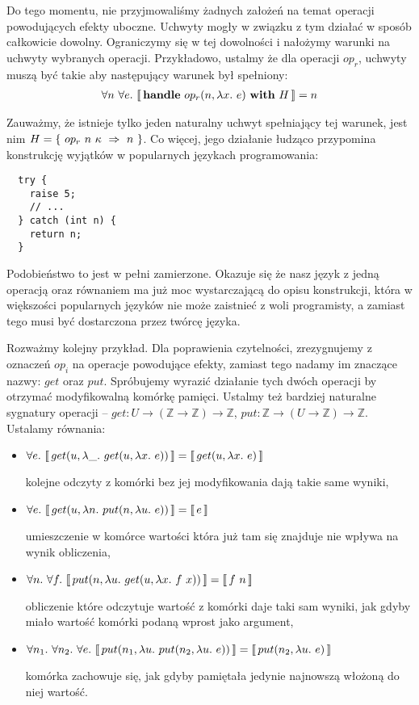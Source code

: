 Do tego momentu, nie przyjmowaliśmy żadnych założeń na temat operacji powodujących efekty uboczne. Uchwyty mogły w związku z tym działać w sposób całkowicie dowolny. Ograniczymy się w tej dowolności i nałożymy warunki na uchwyty wybranych operacji. Przykładowo, ustalmy że dla operacji \(op_r\), uchwyty muszą być takie aby następujący warunek był spełniony:
\begin{align}
  \forall n\ \forall e.\ \llbracket\, \mathbf{handle}\ op_r(n, \lambda x.\ e)\ \mathbf{with}\ H\, \rrbracket = n
\end{align}


Zauważmy, że istnieje tylko jeden naturalny uchwyt spełniający tej warunek, jest nim \(H = \{\ \hcase{op_r}{n\ \kappa}{n} \ \}\). Co więcej, jego działanie łudząco przypomina konstrukcję wyjątków w popularnych językach programowania:

\begin{lstlisting}
  try {
    raise 5;
    // ...
  } catch (int n) {
    return n;
  }
\end{lstlisting}

Podobieństwo to jest w pełni zamierzone. Okazuje się że nasz język z jedną operacją oraz równaniem ma już moc wystarczającą do opisu konstrukcji, która w większości popularnych języków nie może zaistnieć z woli programisty, a zamiast tego musi być dostarczona przez twórcę języka.

Rozważmy kolejny przykład. Dla poprawienia czytelności, zrezygnujemy z oznaczeń \(op_i\) na operacje powodujące efekty, zamiast tego nadamy im znaczące nazwy: \(get\) oraz \(put\). Spróbujemy wyrazić działanie tych dwóch operacji by otrzymać modyfikowalną komórkę pamięci. Ustalmy też bardziej naturalne sygnatury operacji -- \(get: U \rightarrow (\mathbb{Z} \rightarrow \mathbb{Z}) \rightarrow \mathbb{Z}\), \(put: \mathbb{Z} \rightarrow (U \rightarrow \mathbb{Z}) \rightarrow \mathbb{Z}\). Ustalamy równania:

\begin{itemize}
\item \(\forall e.\ \llbracket\, get(u, \lambda \_.\ get(u, \lambda x.\ e))\, \rrbracket = \llbracket\, get(u, \lambda x.\ e)\, \rrbracket\)

  kolejne odczyty z komórki bez jej modyfikowania dają takie same wyniki,
\item \(\forall e.\ \llbracket\, get(u, \lambda n.\ put(n, \lambda u.\ e))\, \rrbracket = \llbracket\, e\, \rrbracket\)

  umieszczenie w komórce wartości która już tam się znajduje nie wpływa na wynik obliczenia,
\item \(\forall n.\ \forall f.\ \llbracket\, put(n, \lambda u.\ get(u, \lambda x.\ f\ x))\, \rrbracket = \llbracket\, f\ n\, \rrbracket\)

  obliczenie które odczytuje wartość z komórki daje taki sam wyniki, jak gdyby miało wartość komórki podaną wprost jako argument,
\item \(\forall n_1.\ \forall n_2.\ \forall e.\ \llbracket\, put(n_1, \lambda u.\ put(n_2, \lambda u.\ e))\, \rrbracket = \llbracket\, put(n_2, \lambda u.\ e)\, \rrbracket\)

  komórka zachowuje się, jak gdyby pamiętała jedynie najnowszą włożoną do niej wartość.
\end{itemize}

